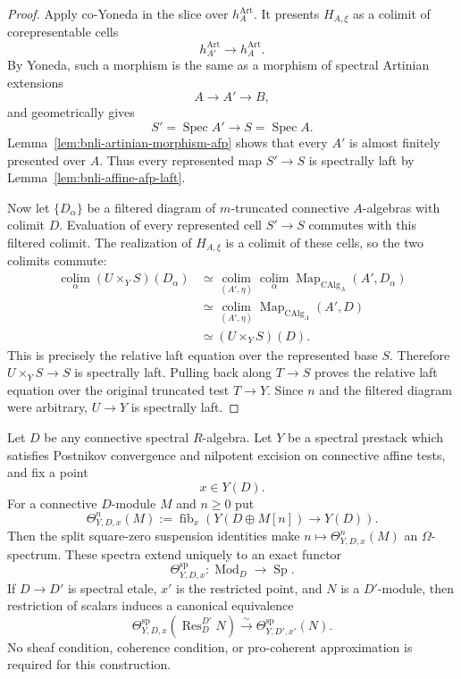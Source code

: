 \begin{proof}
Apply co-Yoneda in the slice over $h_A^{\mathrm{Art}}$.  It presents
$H_{A,\xi}$ as a colimit of corepresentable cells
\[
    h_{A'}^{\mathrm{Art}}
    \longrightarrow
    h_A^{\mathrm{Art}}.
\]
By Yoneda, such a morphism is the same as a morphism of spectral Artinian
extensions
\[
    A\longrightarrow A'\longrightarrow B,
\]
and geometrically gives
\[
    S'=\operatorname{Spec}A'
    \longrightarrow
    S=\operatorname{Spec}A.
\]
Lemma~\ref{lem:bnli-artinian-morphism-afp} shows that every $A'$ is almost
finitely presented over $A$.  Thus every represented map $S'\to S$ is
spectrally laft by
Lemma~\ref{lem:bnli-affine-afp-laft}.

Now let $\{D_\alpha\}$ be a filtered diagram of $m$-truncated connective
$A$-algebras with colimit $D$.  Evaluation of every represented cell
$S'\to S$ commutes with this filtered colimit.  The realization of
$H_{A,\xi}$ is a colimit of these cells, so the two colimits commute:
\[
\begin{aligned}
    \operatorname*{colim}_{\alpha}
    (U\times_YS)(D_\alpha)
    &\simeq
    \operatorname*{colim}_{(A',\eta)}
    \operatorname*{colim}_{\alpha}
    \operatorname{Map}_{\operatorname{CAlg}_A}(A',D_\alpha)\\
    &\simeq
    \operatorname*{colim}_{(A',\eta)}
    \operatorname{Map}_{\operatorname{CAlg}_A}(A',D)\\
    &\simeq
    (U\times_YS)(D).
\end{aligned}
\]
This is precisely the relative laft equation over the represented base $S$.
Therefore $U\times_YS\to S$ is spectrally laft.  Pulling back along
$T\to S$ proves the relative laft equation over the original truncated test
$T\to Y$.  Since $n$ and the filtered diagram were arbitrary,
$U\to Y$ is spectrally laft.
\end{proof}

\begin{lemma}
\label{lem:bnli-raw-square-zero-tangent}
Let $D$ be any connective spectral $R$-algebra.  Let $Y$ be a spectral
prestack which satisfies Postnikov convergence and nilpotent excision on
connective affine tests, and fix a point
\[
    x\in Y(D).
\]
For a connective $D$-module $M$ and $n\geq0$ put
\[
    \Theta^n_{Y,D,x}(M)
    :=
    \operatorname{fib}_{x}
    \left(
      Y(D\oplus M[n])
      \longrightarrow
      Y(D)
    \right).
\]
Then the split square-zero suspension identities make
$n\mapsto\Theta^n_{Y,D,x}(M)$ an $\Omega$-spectrum.  These spectra extend
uniquely to an exact functor
\[
\boxed{
    \Theta^{\mathrm{sp}}_{Y,D,x}:
    \operatorname{Mod}_D
    \longrightarrow
    \operatorname{Sp}.}
\]
If $D\to D'$ is spectral etale, $x'$ is the restricted point, and $N$ is a
$D'$-module, then restriction of scalars induces a canonical equivalence
\[
\boxed{
    \Theta^{\mathrm{sp}}_{Y,D,x}
    \left(
      \operatorname{Res}^{D'}_D N
    \right)
    \xrightarrow{\sim}
    \Theta^{\mathrm{sp}}_{Y,D',x'}(N).}
\]
No sheaf condition, coherence condition, or pro-coherent approximation is
required for this construction.
\end{lemma}

